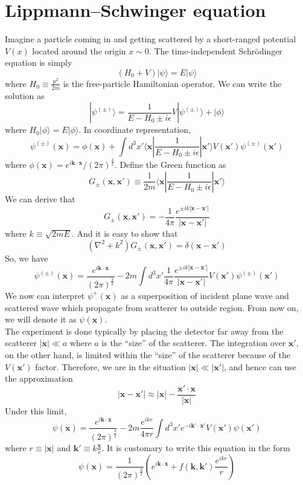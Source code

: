 \section{Lippmann–Schwinger equation}
Imagine a particle coming in and getting scattered by a short-ranged potential $V(x)$ located around the origin $x \sim 0$. The time-independent Schr\"{o}dinger equation is simply
\[(H_0 + V)|\psi\rangle = E |\psi\rangle\]
where $H_0 \equiv \frac{p^2}{2m}$ is the free-particle Hamiltonian operator. We can write the solution as
\[|\psi^{(\pm)}\rangle = \frac{1}{E-H_0 \pm i\epsilon}V|\psi^{(\pm)}\rangle + |\phi\rangle\]
where $H_0 |\phi\rangle = E |\phi\rangle$. In coordinate representation,
\[\psi^{(\pm)}(\mathbf{x}) = \phi(\mathbf{x}) + \int d^3x' \langle \bm{x} | \frac{1}{E-H_0 \pm i\epsilon} | \bm{x}' \rangle V(\bm{x}') \psi^{(\pm)}(\bm{x}')\]
where $\phi(\bm{x}) = e^{i\bm{k}\cdot\bm{x}} / (2\pi)^{\frac{3}{2}}$. Define the Green function as
\[G_{\pm}(\bm{x},\bm{x}') \equiv \frac{1}{2m} \langle \bm{x} | \frac{1}{E-H_0 \pm i\epsilon} | \bm{x}' \rangle\]
We can derive that
\[G_{\pm}(\bm{x},\bm{x}') = -\frac{1}{4\pi} \frac{e^{\pm ik|\bm{x}-\bm{x}'|}}{|\bm{x}-\bm{x}'|}\]
where $k \equiv \sqrt{2mE}$. And it is easy to show that
\[(\nabla^2 + k^2)G_{\pm}(\bm{x},\bm{x}') = \delta(\bm{x}-\bm{x}')\]
So, we have
\[\psi^{(\pm)}(\bm{x}) = \frac{e^{i\bm{k}\cdot\bm{x}}}{(2\pi)^{\frac{3}{2}}} - 2m \int d^3x' \frac{1}{4\pi} \frac{e^{\pm ik|\bm{x}-\bm{x}'|}}{|\bm{x}-\bm{x}'|} V(\bm{x}') \psi^{(\pm)}(\bm{x}')\]
We now can interpret $\psi^{+}(\bm{x})$ as a superposition of incident plane wave and scattered wave which propagate from scatterer to outside region. From now on, we will denote it as $\psi(\bm{x})$.
\\
The experiment is done typically by placing the detector far away from the scatterer $|\bm{x}| \ll a$ where $a$ is the ``size'' of the scatterer. The integration over $\bm{x}'$, on the other hand, is limited within the ``size'' of the scatterer because of the $V(\bm{x}')$ factor. Therefore, we are in the situation $|\bm{x}| \ll |\bm{x}'|$, and hence can use the approximation
\[|\bm{x}-\bm{x}'| \approx |\bm{x}| - \frac{\bm{x}' \cdot \bm{x}}{|\bm{x}|}\]
Under this limit,
\[\psi(\bm{x}) = \frac{e^{i\bm{k}\cdot\bm{x}}}{(2\pi)^{\frac{3}{2}}} - 2m \frac{e^{ikr}}{4\pi r} \int d^3x' e^{-i\bm{k}' \cdot \bm{x}'} V(\bm{x}') \psi(\bm{x}')\]
where $r \equiv |\bm{x}|$ and $\bm{k}' \equiv k \frac{\bm{x}}{r}$. It is customary to write this equation in the form
\[\psi(\bm{x}) = \frac{1}{(2\pi)^{\frac{3}{2}}}\left( e^{i\bm{k}\cdot\bm{x}} +  f(\bm{k},\bm{k}') \frac{e^{ikr}}{r} \right) \]
